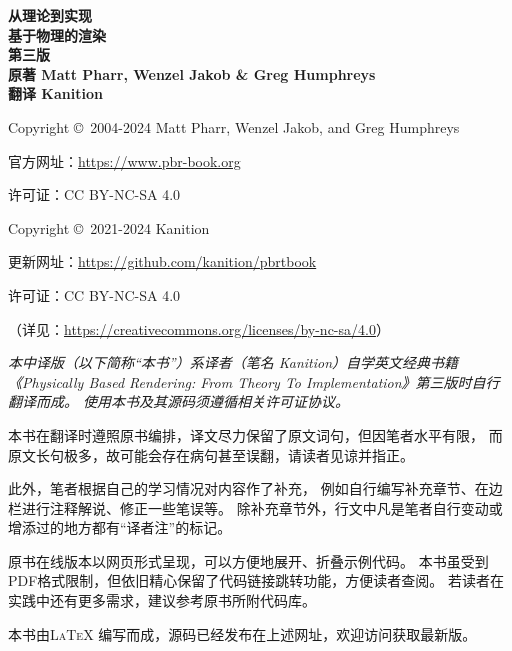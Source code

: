 \noindent \textbf{\LARGE 从理论到实现}\vspace{8pt}\\
\noindent \textbf{\Huge 基于物理的渲染}\vspace{8pt}\\
\noindent \textbf{\large 第三版}\vspace{8pt}\\
\noindent \textbf{\large 原著 \quad Matt Pharr, Wenzel Jakob \& Greg Humphreys}\vspace{5pt}\\
\noindent \textbf{\large 翻译 \quad Kanition}\vspace{16pt}\\


\noindent Copyright \copyright\ 2004-2024 Matt Pharr, Wenzel Jakob, and Greg Humphreys

\noindent 官方网址：\url{https://www.pbr-book.org}

\noindent 许可证：CC BY-NC-SA 4.0\\


\noindent Copyright \copyright\ 2021-2024 Kanition

\noindent 更新网址：\url{https://github.com/kanition/pbrtbook}

\noindent 许可证：CC BY-NC-SA 4.0

    {\small（详见：\url{https://creativecommons.org/licenses/by-nc-sa/4.0}）}

    {\ttfamily\small}

{\itshape
本中译版（以下简称“本书”）系译者（笔名 Kanition）自学英文经典书籍
《Physically Based Rendering: From Theory To Implementation》第三版时自行翻译而成。
使用本书及其源码须遵循相关许可证协议。

本书在翻译时遵照原书编排，译文尽力保留了原文词句，但因笔者水平有限，
而原文长句极多，故可能会存在病句甚至误翻，请读者见谅并指正。

此外，笔者根据自己的学习情况对内容作了补充，
例如自行编写补充章节、在边栏进行注释解说、修正一些笔误等。
除补充章节外，行文中凡是笔者自行变动或增添过的地方都有“译者注”的标记。

原书在线版本以网页形式呈现，可以方便地展开、折叠示例代码。
本书虽受到PDF格式限制，但依旧精心保留了代码链接跳转功能，方便读者查阅。
若读者在实践中还有更多需求，建议参考原书所附代码库。

本书由{\scshape \LaTeX} 编写而成，源码已经发布在上述网址，欢迎访问获取最新版。

{\color{red}}
}